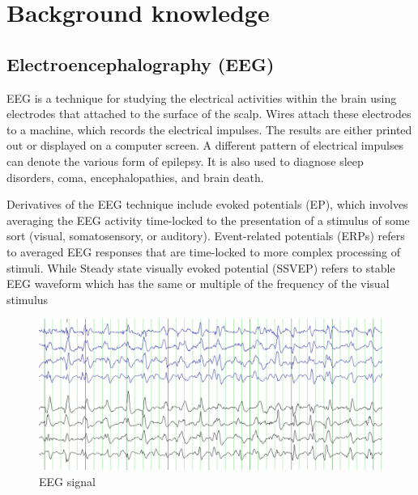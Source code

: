 \chapter{Background knowledge}

\label{ch:Background knowledge}

\setlength{\parindent}{4em}
\setlength{\parskip}{1em}
\renewcommand{\baselinestretch}{1.5}

\section {Electroencephalography (EEG)}

\hspace{1.5cm} EEG is a technique for studying the electrical activities within the brain using electrodes that attached to the surface of the scalp. Wires attach these electrodes to a machine, which records the electrical impulses. The results are either printed out or displayed on a computer screen. A different pattern of electrical impulses can denote the various form of epilepsy\cite{ref9}. It is also used to diagnose sleep disorders, coma, encephalopathies, and brain death.\par
Derivatives of the EEG technique include evoked potentials (EP), which involves averaging the EEG activity time-locked to the presentation of a stimulus of some sort (visual, somatosensory, or auditory). Event-related potentials (ERPs) refers to averaged EEG responses that are time-locked to more complex processing of stimuli. While Steady state visually evoked potential (SSVEP) refers to stable EEG waveform which has the same or multiple of the frequency of the visual stimulus



\begin{figure}[ht]
	\centering
	\includegraphics[scale = 0.5]{chapter3/31.pdf}
	\caption{EEG signal}
\end{figure}
\newpage

